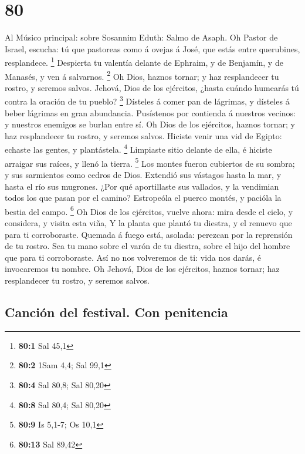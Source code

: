 \hypertarget{section-79}{%
\section{80}\label{section-79}}

 Al Músico principal: sobre Sosannim Eduth: Salmo de Asaph.
Oh Pastor de Israel, escucha: tú que pastoreas como á ovejas á José, que
estás entre querubines, resplandece. \footnote{\textbf{80:1} Sal 45,1}
 Despierta tu valentía delante de Ephraim, y de Benjamín, y
de Manasés, y ven á salvarnos. \footnote{\textbf{80:2} 1Sam 4,4; Sal
  99,1}  Oh Dios, haznos tornar; y haz resplandecer tu
rostro, y seremos salvos.  Jehová, Dios de los ejércitos,
¿hasta cuándo humearás tú contra la oración de tu pueblo? \footnote{\textbf{80:4}
  Sal 80,8; Sal 80,20}  Dísteles á comer pan de lágrimas, y
dísteles á beber lágrimas en gran abundancia.  Pusístenos
por contienda á nuestros vecinos: y nuestros enemigos se burlan entre
sí.  Oh Dios de los ejércitos, haznos tornar; y haz
resplandecer tu rostro, y seremos salvos.  Hiciste venir una
vid de Egipto: echaste las gentes, y plantástela. \footnote{\textbf{80:8}
  Sal 80,4; Sal 80,20}  Limpiaste sitio delante de ella, é
hiciste arraigar sus raíces, y llenó la tierra. \footnote{\textbf{80:9}
  Is 5,1-7; Os 10,1}  Los montes fueron cubiertos de su
sombra; y sus sarmientos como cedros de Dios.  Extendió sus
vástagos hasta la mar, y hasta el río sus mugrones.  ¿Por
qué aportillaste sus vallados, y la vendimian todos los que pasan por el
camino?  Estropeóla el puerco montés, y pacióla la bestia
del campo. \footnote{\textbf{80:13} Sal 89,42}  Oh Dios de
los ejércitos, vuelve ahora: mira desde el cielo, y considera, y visita
esta viña,  Y la planta que plantó tu diestra, y el renuevo
que para ti corroboraste.  Quemada á fuego está, asolada:
perezcan por la reprensión de tu rostro.  Sea tu mano sobre
el varón de tu diestra, sobre el hijo del hombre que para ti
corroboraste.  Así no nos volveremos de ti: vida nos darás,
é invocaremos tu nombre.  Oh Jehová, Dios de los ejércitos,
haznos tornar; haz resplandecer tu rostro, y seremos salvos.

\hypertarget{canciuxf3n-del-festival.-con-penitencia}{%
\subsection{Canción del festival. Con
penitencia}\label{canciuxf3n-del-festival.-con-penitencia}}

